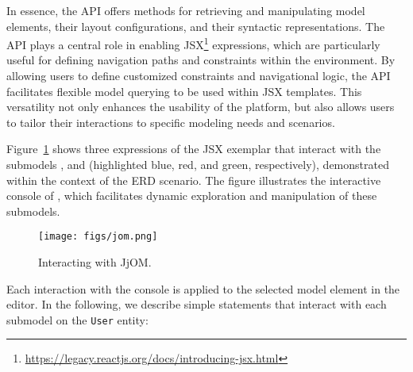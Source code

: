 %
%
%
In essence, the API offers methods for retrieving and manipulating model elements, their layout configurations, and their syntactic representations. 
%
The API plays a central role in enabling JSX\footnote{\url{https://legacy.reactjs.org/docs/introducing-jsx.html}} expressions, which are particularly useful for defining navigation paths and constraints within the \jjodel{} environment. By allowing users to define customized constraints and navigational logic, the API facilitates flexible model querying to be used within JSX templates. This versatility not only enhances the usability of the platform, but also allows users to tailor their interactions to specific modeling needs and scenarios. 

\medskip
Figure~\ref{fig:jjom} shows three expressions of the JSX exemplar that interact with the submodels ,  and  (highlighted blue, red, and green, respectively), demonstrated within the context of the ERD scenario. The figure illustrates the interactive console of \jjodel{}, which facilitates dynamic exploration and manipulation of these submodels.
%
\begin{comment}
\begin{lstlisting}[language=jsx,caption=Interacting with JjOM.,label=lst:jjom]
 data.$ownedAttributes.values.map(attr => attr.name) // => [ 'id', 'surname', 'firstname' ]
 `${node.x} * ${node.y} = ${node.x * node.y}` // => 495 * 120 = 59400
 view.oclCondition // => context DObject inv: self.instanceof.name = 'Entity'
\end{lstlisting}
\end{comment}
\begin{figure}
    \centering
    \texttt{[image: figs/jom.png]}
    \caption{Interacting with JjOM.}
    \label{fig:jjom}
\end{figure}
%
Each interaction with the console is applied to the selected model element in the editor. In the following, we describe simple statements that interact with each submodel on the \texttt{User} entity:

